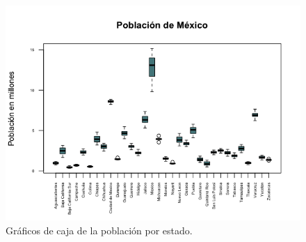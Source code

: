 \documentclass[12pt,letterpaper]{article}
\begin{document}
\begin{figure}[h!]
\centering
\includegraphics[scale=0.7]{estados.png}
\caption{Gráficos de caja de la población por estado.}
\label{Estados}
\end{figure}
\newpage
\end{document}
